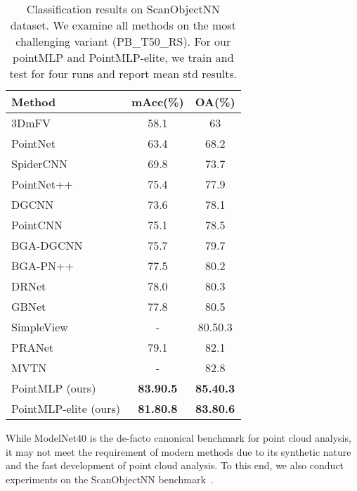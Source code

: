 \documentclass{article} \usepackage{iclr2022_conference,times}
\begin{document}
\begin{wraptable}{r}{8.9cm}
\small
    \centering
    \vspace{-7mm}
    \caption{Classification results on ScanObjectNN dataset. We examine all methods on the most challenging variant (PB\_T50\_RS). For our pointMLP and PointMLP-elite, we train and test for four runs and report mean  std results.
    }
    \label{tab:my_label}
    \vspace{1mm}
    \begin{tabular}{l|cc}
        \toprule
         Method & mAcc(\%) &OA(\%) \\
         \midrule
         3DmFV & 58.1&63\\
         PointNet~\citep{qi2017pointnet} &63.4 &68.2 \\
         SpiderCNN~\citep{xu2018spidercnn} &69.8 &73.7 \\
         PointNet++~\citep{qi2017pointnet++} &75.4 &77.9 \\
         DGCNN~\citep{wang2019dynamic} &73.6 &78.1 \\
         PointCNN~\citep{li2018pointcnn} &75.1 &78.5 \\
         BGA-DGCNN~\citep{uy2019revisiting} &75.7 &79.7 \\
         BGA-PN++~\citep{uy2019revisiting} &77.5 &80.2 \\
         DRNet~\citep{qiu2021dense} &78.0 &80.3 \\
         GBNet~\citep{qiu2021geometric} &77.8 &80.5 \\
         SimpleView~\citep{goyal2021revisiting} & - &80.50.3 \\
         PRANet~\citep{cheng2021net} & 79.1&82.1 \\
         MVTN~\citep{hamdi2021mvtn} & -&82.8 \\
         \midrule
         PointMLP \small{(ours)} &\textbf{83.90.5} &\textbf{85.40.3}\\
         
         PointMLP-elite \small{(ours)} &\textbf{81.80.8} &\textbf{83.80.6}\\
         
         \bottomrule
    \end{tabular}
    \label{tab:cls_scanobjectNN}
    \vspace{-3mm}
\end{wraptable}

While ModelNet40 is the de-facto canonical benchmark for point cloud analysis, it may not meet the requirement of modern methods due to its synthetic nature and the fast development of point cloud analysis. To this end, we also conduct experiments on the ScanObjectNN benchmark~\citep{uy2019revisiting}. 
\end{document}
